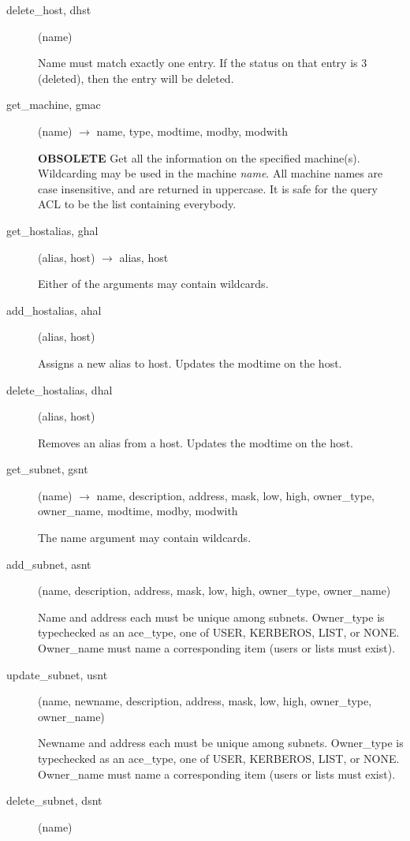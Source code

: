 \documentclass{article}
\begin{document}
\begin{description}
\item[delete\_host, dhst](name)

Name must match exactly one entry.  If the status on that entry is 3
(deleted), then the entry will be deleted.

\item[get\_machine, gmac](name) $\rightarrow$ name, type, modtime, modby, modwith

{\bf OBSOLETE} Get all the information on the specified machine(s).
Wildcarding may be used in the machine {\em name}.  All machine names
are case insensitive, and are returned in uppercase.  It is safe for
the query ACL to be the list containing everybody.

\item[get\_hostalias, ghal](alias, host) $\rightarrow$ alias, host

Either of the arguments may contain wildcards.

\item[add\_hostalias, ahal](alias, host)

Assigns a new alias to host.  Updates the modtime on the host.

\item[delete\_hostalias, dhal](alias, host)

Removes an alias from a host.  Updates the modtime on the
host.

\item[get\_subnet, gsnt](name) $\rightarrow$ name, description, address,
mask, low, high, owner\_type, owner\_name, modtime, modby, modwith

The name argument may contain wildcards.

\item[add\_subnet, asnt](name, description, address, mask, low, high, owner\_type,
owner\_name)

Name and address each must be unique among subnets.  Owner\_type
is typechecked as an ace\_type, one of USER, KERBEROS, LIST, or NONE.
Owner\_name must name a corresponding item (users or lists must exist).

\item[update\_subnet, usnt](name, newname, description, address, mask, low, high,
owner\_type, owner\_name)

Newname and address each must be unique among subnets.  Owner\_type
is typechecked as an ace\_type, one of USER, KERBEROS, LIST, or NONE.
Owner\_name must name a corresponding item (users or lists must exist).

\item[delete\_subnet, dsnt](name)


\end{description}
\end{document}
